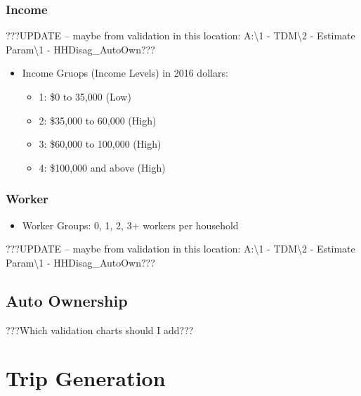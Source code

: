 \documentclass[
  letterpaper,
  DIV=11,
  numbers=noendperiod]{scrreprt}
\providecommand{\tightlist}{%
  \setlength{\itemsep}{0pt}\setlength{\parskip}{0pt}}\usepackage{longtable,booktabs,array}
\begin{document}
\hypertarget{income}{%
\subsection{Income}\label{income}}

???UPDATE -- maybe from validation in this location: A:\textbackslash1 -
TDM\textbackslash2 - Estimate Param\textbackslash1 - HHDisag\_AutoOwn???

\begin{itemize}
\tightlist
\item
  Income Gruops (Income Levels) in 2016 dollars:

  \begin{itemize}
  \tightlist
  \item
    1: \$0 to 35,000 (Low)
  \item
    2: \$35,000 to 60,000 (High)
  \item
    3: \$60,000 to 100,000 (High)
  \item
    4: \$100,000 and above (High)
  \end{itemize}
\end{itemize}

\hypertarget{worker}{%
\subsection{Worker}\label{worker}}

\begin{itemize}
\tightlist
\item
  Worker Groups: 0, 1, 2, 3+ workers per household
\end{itemize}

???UPDATE -- maybe from validation in this location: A:\textbackslash1 -
TDM\textbackslash2 - Estimate Param\textbackslash1 - HHDisag\_AutoOwn???

\hypertarget{auto-ownership}{%
\section{Auto Ownership}\label{auto-ownership}}

???Which validation charts should I add???


\hypertarget{trip-generation}{%
\chapter{Trip Generation}\label{trip-generation}}
\end{document}
